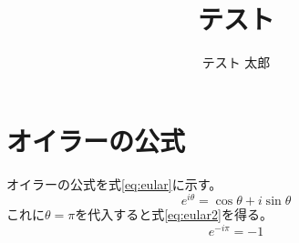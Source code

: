 \documentclass[14pt,ja=standard,nomag*,lualatex]{bxjsarticle}
\title{テスト}
\author{テスト 太郎}
\begin{document}
\maketitle
\section{オイラーの公式}
オイラーの公式を式\ref{eq:eular}に示す。
\begin{equation}\label{eq:eular}
  e^{i\theta} = \cos\theta + i\sin\theta
\end{equation}
これに$\theta = \pi$を代入すると式\ref{eq:eular2}を得る。
\begin{equation}\label{eq:eular2}
  e^{-i\pi} = -1
\end{equation}
\end{document}
